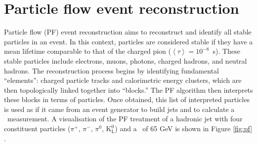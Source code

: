 \section{Particle flow event reconstruction}
\label{sec:reco-pf}

Particle flow (PF)  
event reconstruction aims to reconstruct and identify
all stable particles in an event. 
In this context, particles are considered stable if
they have a mean lifetime comparable to that of the charged pion
($\left<\tau\right> = 10^{-8}$~s).
These stable particles include electrons, muons, 
photons, charged hadrons, and neutral hadrons.  
The reconstruction process begins by identifying 
fundamental ``elements'': charged particle tracks
and calorimetric energy clusters, which are then 
topologically linked together into ``blocks.''
The PF algorithm then interprets these 
blocks in terms of particles.
Once obtained, this list of interpreted particles
is used as if it came from an event generator to build
jets and to calculate a \met~measurement.
A visualisation of the PF treatment of a hadronic jet
with four constituent particles ($\pi^+$, $\pi^-$, $\pi^0$, $\text{K}_{\text{L}}^0$)
and a \pt~of 65 GeV is shown in Figure \ref{fig:pf} \cite{pf-1}.

